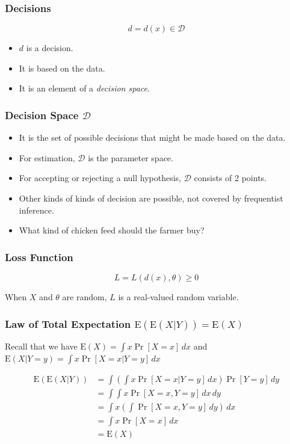 \documentclass[12pt]{beamer}
\begin{document}
\begin{frame}
	\frametitle{Decisions}
	
	\[
	d = d(x) \in \mathcal{D}
	\]
	
	\begin{itemize}[label={\color{blue}$\blacktriangleright$}]
		\item $d$ is a decision.
		
		\item It is based on the data.
		
		\item It is an element of a \textit{decision space}.
	\end{itemize}
	
\end{frame}
\begin{frame}
	\frametitle{Decision Space $\mathcal{D}$}
	
	\begin{itemize}[label={\color{blue}$\blacktriangleright$}]
		\item It is the set of possible decisions that might be made based on the data.
		
		\item For estimation, $\mathcal{D}$ is the parameter space.
		
		\item For accepting or rejecting a null hypothesis, $\mathcal{D}$ consists of 2 points.
		
		\item Other kinds of kinds of decision are possible, not covered by frequentist inference.
		
		\item What kind of chicken feed should the farmer buy?
	\end{itemize}
	
\end{frame}
\begin{frame}
	\frametitle{Loss Function}
	
	\[
	L = L(d(x), \theta) \geq 0
	\]

	
	When $X$ and $\theta$ are random, $L$ is a real-valued random variable.
	
\end{frame}
\begin{frame}
	\frametitle{Law of Total Expectation $\mathrm{E}(\mathrm{E}(X|Y)) = \mathrm{E}(X)$}
	
	Recall that we have $\mathrm{E}(X) = \int x \Pr[X = x] \, dx$ and $\mathrm{E}(X|Y=y) = \int x \Pr[X = x|Y = y] \, dx$
	
	\begin{align*}
			\mathrm{E}(\mathrm{E}(X|Y)) &= \int \left(\int x \Pr[X = x|Y = y] \, dx\right) \Pr[Y = y] \, dy \\
			&= \int\int x \Pr[X = x, Y = y] \, dx \, dy \\
			&= \int x \left(\int \Pr[X = x, Y = y] \, dy\right) \, dx \\
			&= \int x \Pr[X = x] \, dx \\
			&= \mathrm{E}(X)
		\end{align*}
	
\end{frame}
\end{document}
